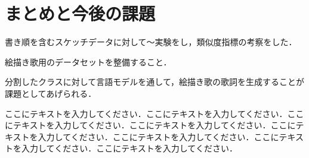 \documentclass[twocolumn]{jarticle}     %
\begin{document}
\section{まとめと今後の課題}
書き順を含むスケッチデータに対して～実験をし，類似度指標の考察をした．

絵描き歌用のデータセットを整備すること．

分割したクラスに対して言語モデルを通して，絵描き歌の歌詞を生成することが課題としてあげられる．

ここにテキストを入力してください．ここにテキストを入力してください．ここにテキストを入力してください．ここにテキストを入力してください．ここにテキストを入力してください．ここにテキストを入力してください．ここにテキストを入力してください．ここにテキストを入力してください．



\end{document}
